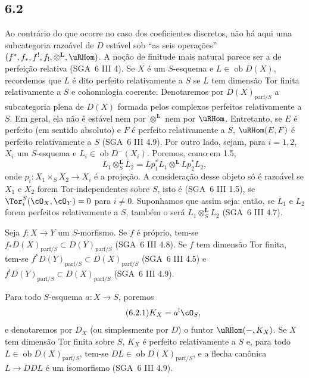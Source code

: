 \subsection*{6.2}
Ao contrário do que ocorre no caso dos coeficientes discretos, não há aqui uma subcategoria razoável de $D$ estável sob ``as seis operações'' $(f^*,f_*,f^!,f_!,\otimes^{\mathbf L},\uRHom)$. A noção de finitude mais natural parece ser a de perfeição relativa (SGA~6 III 4). Se $X$ é um $S$-esquema e $L\in\operatorname{ob}D(X)$, recordemos que $L$ é dito perfeito relativamente a $S$ se $L$ tem dimensão Tor finita relativamente a $S$ e cohomologia coerente. Denotaremos por $D(X)_{\mathrm{parf}/S}$ a subcategoria plena de $D(X)$ formada pelos complexos perfeitos relativamente a $S$. Em geral, ela não é estável nem por $\otimes^{\mathbf L}$ nem por $\uRHom$. Entretanto, se $E$ é perfeito (em sentido absoluto) e $F$ é perfeito relativamente a $S$, $\uRHom(E,F)$ é perfeito relativamente a $S$ (SGA~6 III 4.9). Por outro lado, sejam, para $i=1,2$, $X_i$ um $S$-esquema e $L_i\in\operatorname{ob}D^{-}(X_i)$. Poremos, como em 1.5,
\[
L_1\otimes_S^{\mathbf L}L_2=Lp_1^*L_1\otimes^{\mathbf L}Lp_2^*L_2,
\]
onde $p_i:X_1\times_SX_2\to X_i$ é a projeção. A consideração desse objeto só é razoável se $X_1$ e $X_2$ forem Tor-independentes sobre $S$, isto é (SGA~6 III 1.5), se $\Tor_i^S(\cO_X,\cO_Y)=0$ para $i\ne0$. Suponhamos que assim seja: então, se $L_1$ e $L_2$ forem perfeitos relativamente a $S$, também o será $L_1\otimes_S^{\mathbf L}L_2$ (SGA~6 III 4.7).

Seja $f:X\to Y$ um $S$-morfismo. Se $f$ é próprio, tem-se $f_*D(X)_{\mathrm{parf}/S}\subset D(Y)_{\mathrm{parf}/S}$ (SGA~6 III 4.8). Se $f$ tem dimensão Tor finita, tem-se $f^*D(Y)_{\mathrm{parf}/S}\subset D(X)_{\mathrm{parf}/S}$ (SGA~6 III 4.5) e $f^!D(Y)_{\mathrm{parf}/S}\subset D(X)_{\mathrm{parf}/S}$ (SGA~6 III 4.9).

Para todo $S$-esquema $a:X\to S$, poremos
\begin{equation}
\tag{6.2.1}
K_X=a^!\cO_S,
\end{equation}
e denotaremos por $D_X$ (ou simplesmente por $D$) o funtor $\uRHom(-,K_X)$. Se $X$ tem dimensão Tor finita sobre $S$, $K_X$ é perfeito relativamente a $S$ e, para todo $L\in\operatorname{ob}D(X)_{\mathrm{parf}/S}$, tem-se $DL\in\operatorname{ob}D(X)_{\mathrm{parf}/S}$, e a flecha canônica $L\to DDL$ é um isomorfismo (SGA~6 III 4.9).

